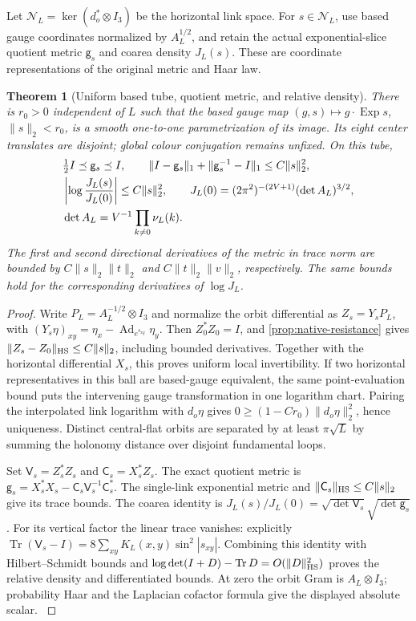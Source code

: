 \documentclass[11pt,oneside,openany]{book}
\newtheorem{theorem}{Theorem}[chapter]
\theoremstyle{definition}
\theoremstyle{remark}
\newcommand{\Tr}{\operatorname{Tr}}
\newcommand{\src}[2]{\cite[#2]{#1}}
\begin{document}
Let $\mathcal N_L=\ker(d_o^*\otimes I_3)$ be the horizontal link space.
For $s\in\mathcal N_L$, use based gauge coordinates normalized by
$A_L^{1/2}$, and retain the actual exponential-slice quotient metric
$\mathsf g_s$ and coarea density $J_L(s)$. These are coordinate
representations of the original metric and Haar law.

\begin{theorem}[Uniform based tube, quotient metric, and relative density]
\label{thm:native-uniform-geometry}
There is $r_0>0$ independent of $L$ such that the based gauge map
$(g,s)\mapsto g\cdot\operatorname{Exp}s$, $\|s\|_2<r_0$, is a
smooth one-to-one parametrization of its image. Its eight center
translates are disjoint; global colour conjugation remains unfixed.
On this tube,
\begin{align}
 &\tfrac12I\preceq\mathsf g_s\preceq I,\qquad
 \|I-\mathsf g_s\|_1+\|\mathsf g_s^{-1}-I\|_1\le C\|s\|_2^2,\notag\\
 &\left|\log\frac{J_L(s)}{J_L(0)}\right|\le C\|s\|_2^2,\qquad
 J_L(0)=(2\pi^2)^{-(2V+1)}(\det A_L)^{3/2},\notag\\
 &\det A_L=V^{-1}\prod_{k\ne0}\nu_L(k).
 \label{eq:native-uniform-geometry}
\end{align}
The first and second directional derivatives of the metric in trace
norm are bounded by $C\|s\|_2\|t\|_2$ and
$C\|t\|_2\|v\|_2$, respectively. The same bounds hold for the
corresponding derivatives of $\log J_L$.
\end{theorem}
\begin{proof}
Write $P_L=A_L^{-1/2}\otimes I_3$ and normalize the orbit differential
as $Z_s=Y_sP_L$, with
$(Y_s\eta)_{xy}=\eta_x-\operatorname{Ad}_{e^{s_{xy}}}\eta_y$.
Then $Z_0^*Z_0=I$, and \cref{prop:native-resistance} gives
$\|Z_s-Z_0\|_{\rm HS}\le C\|s\|_2$, including bounded derivatives.
Together with the horizontal differential $X_s$, this proves uniform
local invertibility. If two horizontal representatives in this ball
are based-gauge equivalent, the same point-evaluation bound puts the
intervening gauge transformation in one logarithm chart. Pairing the
interpolated link logarithm with $d_o\eta$ gives
$0\ge(1-Cr_0)\|d_o\eta\|_2^2$, hence uniqueness.
Distinct central-flat orbits are separated by at least $\pi\sqrt L$
by summing the holonomy distance over disjoint fundamental loops.

Set $\mathsf V_s=Z_s^*Z_s$ and $\mathsf C_s=X_s^*Z_s$.
The exact quotient metric is
$\mathsf g_s=X_s^*X_s-\mathsf C_s\mathsf V_s^{-1}\mathsf C_s^*$.
The single-link exponential metric and
$\|\mathsf C_s\|_{\rm HS}\le C\|s\|_2$ give its trace bounds.
The coarea identity is
$J_L(s)/J_L(0)=\sqrt{\det\mathsf V_s}\sqrt{\det\mathsf g_s}$.
For its vertical factor the linear trace vanishes: explicitly
$\Tr(\mathsf V_s-I)=8\sum_{xy}K_L(x,y)\sin^2|s_{xy}|$.
Combining this identity with Hilbert--Schmidt bounds and
$\log\det(I+D)-\Tr D=O(\|D\|_{\rm HS}^2)$ proves the relative
density and differentiated bounds. At zero the orbit Gram is
$A_L\otimes I_3$; probability Haar and the Laplacian cofactor formula
give the displayed absolute scalar. \src{F16B}{V50}
\end{proof}
\end{document}
